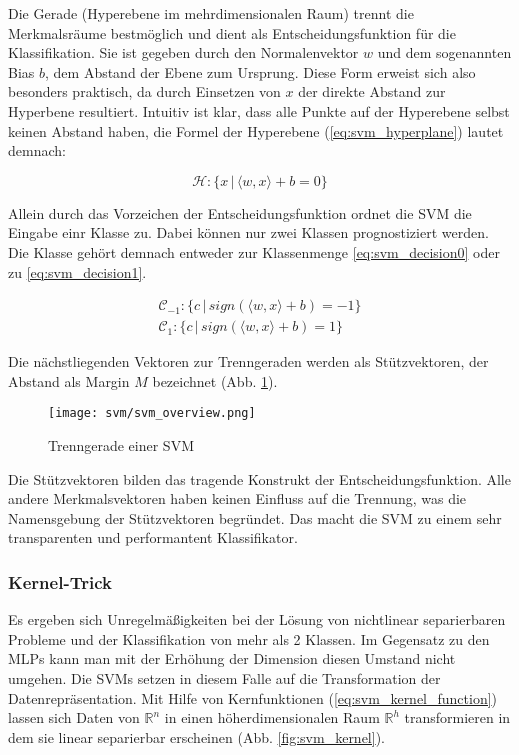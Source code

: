 Die Gerade (Hyperebene im mehrdimensionalen Raum) trennt die Merkmalsräume bestmöglich und dient als Entscheidungsfunktion für die Klassifikation. Sie ist gegeben durch den Normalenvektor $w$ und dem sogenannten Bias $b$, dem Abstand der Ebene zum Ursprung. Diese Form erweist sich also besonders praktisch, da durch Einsetzen von $x$ der direkte Abstand zur Hyperbene resultiert.
Intuitiv ist klar, dass alle Punkte auf der Hyperebene selbst keinen Abstand haben, die Formel der Hyperebene (\ref{eq:svm_hyperplane}) lautet demnach: 
 
\begin{equation}
\label{eq:svm_hyperplane}
    \mathcal{H}: \{ x \,|\, \langle w,x \rangle + b = 0 \}
\end{equation}
 
Allein durch das Vorzeichen der Entscheidungsfunktion ordnet die \ac{SVM} die Eingabe einr Klasse zu. Dabei können nur zwei Klassen  prognostiziert werden. Die Klasse gehört demnach entweder zur Klassenmenge \ref{eq:svm_decision0} oder zu \ref{eq:svm_decision1}.

\begin{eqnarray}
    \mathcal{C}_{-1}: \{ c \,|\, sign(\langle w,x \rangle + b) = -1 \} \label{eq:svm_decision0} \\
    \mathcal{C}_1: \{ c \,|\, sign(\langle w,x \rangle + b) = 1 \} \label{eq:svm_decision1}
\end{eqnarray}

Die nächstliegenden Vektoren zur Trenngeraden werden als Stützvektoren, der Abstand als Margin $M$ bezeichnet (Abb. \ref{fig:svm_separator}). 

\begin{figure}[htbp] \centering
    \texttt{[image: svm/svm\_overview.png]}
    \caption{Trenngerade einer SVM}
    \label{fig:svm_separator}
\end{figure}

Die Stützvektoren bilden das tragende Konstrukt der Entscheidungsfunktion. 
Alle andere Merkmalsvektoren haben keinen Einfluss auf die Trennung, was die Namensgebung der Stützvektoren begründet. 
Das macht die \ac{SVM} zu einem sehr transparenten und performantent Klassifikator. 


\subsubsection{Kernel-Trick}
Es ergeben sich Unregelmäßigkeiten bei der Lösung von nichtlinear separierbaren Probleme und der Klassifikation von mehr als 2 Klassen.
Im Gegensatz zu den MLPs kann man mit der Erhöhung der Dimension diesen Umstand nicht umgehen. 
Die \ac{SVMs} setzen in diesem Falle auf die Transformation der Datenrepräsentation. 
Mit Hilfe von Kernfunktionen (\ref{eq:svm_kernel_function}) lassen sich Daten von $\mathbb{R}^n$ in einen höherdimensionalen Raum $\mathbb{R}^h$ transformieren in dem sie linear separierbar erscheinen (Abb. \ref{fig:svm_kernel}). 

